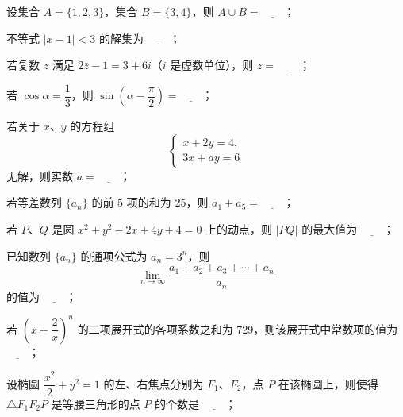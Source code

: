 \begin{question}
设集合 $A=\{1,2,3\}$，集合 $B=\{3,4\}$，则 $A\cup B=\underline{\qquad}$；

\end{question}
\begin{question}
不等式 $|x-1|<3$ 的解集为 $\underline{\qquad}$；

\end{question}
\begin{question}
若复数 $z$ 满足 $2\bar z-1=3+6i$（$i$ 是虚数单位），则 $z=\underline{\qquad}$；

\end{question}
\begin{question}
若 $\cos\alpha=\dfrac13$，则 $\sin\left(\alpha-\dfrac\pi2\right)=\underline{\qquad}$；

\end{question}
\begin{question}
若关于 $x\text{、}y$ 的方程组
\nopagebreak[4]
\[
\begin{cases}
x+2y=4,\\
3x+ay=6
\end{cases}
\]
无解，则实数 $a=\underline{\qquad}$；

\end{question}
\begin{question}
若等差数列 $\{a_n\}$ 的前 5 项的和为 25，则 $a_1+a_5=\underline{\qquad}$；

\end{question}
\begin{question}
若 $P\text{、}Q$ 是圆 $x^2+y^2-2x+4y+4=0$ 上的动点，则 $|PQ|$ 的最大值为 $\underline{\qquad}$；

\end{question}
\begin{question}
已知数列 $\{a_n\}$ 的通项公式为 $a_n=3^n$，则
\nopagebreak[4]
\[
\lim_{n\to\infty}\frac{a_1+a_2+a_3+\cdots+a_n}{a_n}
\]
的值为 $\underline{\qquad}$；

\end{question}
\begin{question}
若 $\left(x+\dfrac2x\right)^n$ 的二项展开式的各项系数之和为 729，则该展开式中常数项的值为 $\underline{\qquad}$；

\end{question}
\begin{question}
设椭圆 $\dfrac{x^2}{2}+y^2=1$ 的左、右焦点分别为 $F_1\text{、}F_2$，点 $P$ 在该椭圆上，则使得 $\triangle F_1F_2P$ 是等腰三角形的点 $P$ 的个数是 $\underline{\qquad}$；

\end{question}
